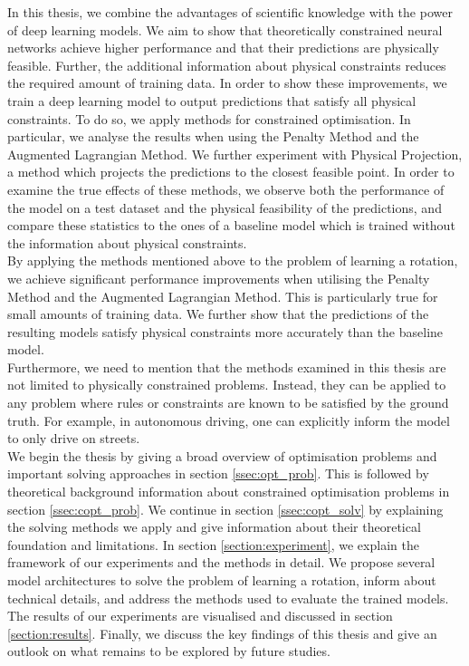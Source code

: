 \indent In this thesis, we combine the advantages of scientific knowledge with the power of deep learning models. We aim to show that theoretically constrained neural networks achieve higher performance and that their predictions are physically feasible. Further, the additional information about physical constraints reduces the required amount of training data. In order to show these improvements, we train a deep learning model to output predictions that satisfy all physical constraints. To do so, we apply methods for constrained optimisation. In particular, we analyse the results when using the Penalty Method and the Augmented Lagrangian Method. We further experiment with Physical Projection, a method which projects the predictions to the closest feasible point. In order to examine the true effects of these methods, we observe both the performance of the model on a test dataset and the physical feasibility of the predictions, and compare these statistics to the ones of a baseline model which is trained without the information about physical constraints.\\
\indent By applying the methods mentioned above to the problem of learning a rotation, we achieve significant performance improvements when utilising the Penalty Method and the Augmented Lagrangian Method. This is particularly true for small amounts of training data. We further show that the predictions of the resulting models satisfy physical constraints more accurately than the baseline model.\\
\indent Furthermore, we need to mention that the methods examined in this thesis are not limited to physically constrained problems. Instead, they can be applied to any problem where rules or constraints are known to be satisfied by the ground truth. For example, in autonomous driving, one can explicitly inform the model to only drive on streets.\\
\indent We begin the thesis by giving a broad overview of optimisation problems and important solving approaches in section \ref{ssec:opt_prob}. This is followed by theoretical background information about constrained optimisation problems in section \ref{ssec:copt_prob}. We continue in section \ref{ssec:copt_solv} by explaining the solving methods we apply and give information about their theoretical foundation and limitations. In section \ref{section:experiment}, we explain the framework of our experiments and the methods in detail. We propose several model architectures to solve the problem of learning a rotation, inform about technical details, and address the methods used to evaluate the trained models. The results of our experiments are visualised and discussed in section \ref{section:results}. Finally, we discuss the key findings of this thesis and give an outlook on what remains to be explored by future studies.


\clearpage

